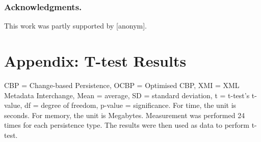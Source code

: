 \documentclass{llncs}
\begin{document}
    \subsubsection*{Acknowledgments.} This work was partly supported by [anonym]. %
     
    
    
    \section*{Appendix: T-test Results}
    \label{app:t_test_results}
    CBP = Change-based Persistence, OCBP = Optimised CBP, XMI = XML Metadata Interchange, Mean = average, SD = standard deviation, t = t-test's t-value, df = degree of freedom, p-value = significance. For time, the unit is seconds. For memory, the unit is Megabytes. Measurement was performed 24 times for each persistence type. The results were then used as data to perform t-test.
    
\end{document}
